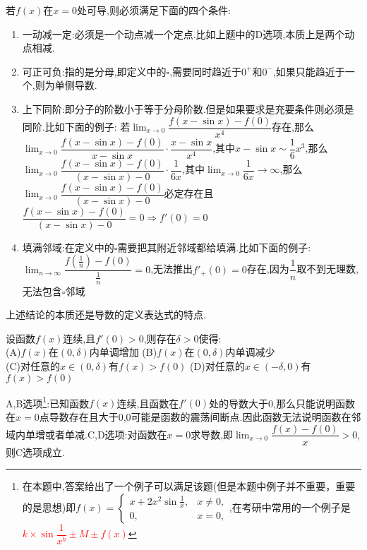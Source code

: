 \documentclass[8pt a4paper, oneside, UTF8]{ctexbook}  %
\begin{document}
\begin{sloppypar}
\begin{conclusion}{若$f(x)$在$x=0$处可导,则必须满足下面的四个条件:}{}
        \begin{enumerate}
            \item 一动减一定:必须是一个动点减一个定点.比如上题中的D选项,本质上是两个动点相减.
            \item 可正可负:指的是分母,即定义中的$\square$,需要同时趋近于$0^+$和$0^-$,如果只能趋近于一个,则为单侧导数.
            \item 上下同阶:即分子的阶数小于等于分母阶数.但是如果要求是充要条件则必须是同阶.比如下面的例子:
            若$\lim_{x\to 0}\dfrac{f(x-\sin x)-f(0)}{x^4}$存在,那么$\lim_{x\to 0}\dfrac{f(x-\sin x)-f(0)}{x-\sin x}\cdot \dfrac{x - \sin x}{x^4}$,其中$ x - \sin x \sim \dfrac{1}{6}x^3$,那么$\lim_{x\to 0}\dfrac{f(x-\sin x)-f(0)}{(x-\sin x)-0}\cdot \dfrac{1}{6x}$,其中$\lim_{x\to 0} \dfrac{1}{6x} \to \infty$,那么$\lim_{x\to 0}\dfrac{f(x-\sin x)-f(0)}{(x-\sin x)-0}$必定存在且$\dfrac{f(x-\sin x)-f(0)}{(x-\sin x)-0}=0 \Rightarrow f'(0)=0$
            \item 填满邻域:在定义中的$\square$需要把其附近邻域都给填满.比如下面的例子:$\lim_{n\to \infty}\dfrac{f(\frac{1}{n})-f(0)}{\frac{1}{n}}=0$,无法推出$f'_+(0)=0$存在,因为$\dfrac{1}{n}$取不到无理数,无法包含$\square$邻域
        \end{enumerate}
        上述结论的本质还是导数的定义表达式的特点.
    \end{conclusion}
    \begin{problem}
        设函数$f(x)$连续,且$f'(0)>0$,则存在$\delta >0 $使得:\\
        (A)$f(x)$在$(0,\delta)$内单调增加 \quad (B)$f(x)$在$(0,\delta)$内单调减少\\
        (C)对任意的$x \in (0,\delta)$有$f(x)>f(0)$ \quad    (D)对任意的$x\in (-\delta,0)$有$f(x)>f(0)$
        \end{problem}
        \begin{solution}
            A,B选项\footnote{在本题中,答案给出了一个例子可以满足该题(但是本题中例子并不重要，重要的是思想)即$\left.f\left(x\right)=\left\{\begin{matrix}x+2x^{2}\sin\frac{1}{x},&x\neq0,\\0,&x=0,\end{matrix}\right.\right.$,在考研中常用的一个例子是\textcolor{red}{$k \times \sin \dfrac{1}{x^b}\pm M \pm f(x)$}}:已知函数$f(x)$连续,且函数在$f'(0)$处的导数大于0,那么只能说明函数在$x=0$点导数存在且大于0,0可能是函数的震荡间断点.因此函数无法说明函数在邻域内单增或者单减.C,D选项:对函数在$x=0$求导数,即$\lim_{x\to 0} \dfrac{f(x)-f(0)}{x}>0$,则C选项成立.
        \end{solution}

\end{sloppypar}
\end{document}
